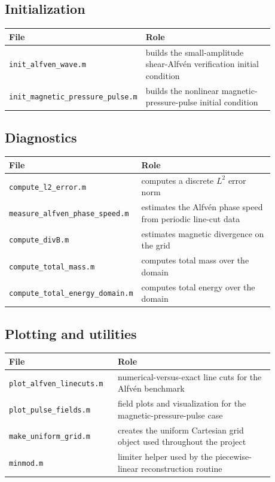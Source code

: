 \documentclass[11pt]{article}
\begin{document}
\subsection{Initialization}
\begin{center}
\begin{tabular}{p{0.33\linewidth} p{0.55\linewidth}}
\toprule
\textbf{File} & \textbf{Role} \\
\midrule
\texttt{init\_alfven\_wave.m} & builds the small-amplitude shear-Alfv\'en verification initial condition \\
\texttt{init\_magnetic\_pressure\_pulse.m} & builds the nonlinear magnetic-pressure-pulse initial condition \\
\bottomrule
\end{tabular}
\end{center}

\subsection{Diagnostics}
\begin{center}
\begin{tabular}{p{0.33\linewidth} p{0.55\linewidth}}
\toprule
\textbf{File} & \textbf{Role} \\
\midrule
\texttt{compute\_l2\_error.m} & computes a discrete $L^2$ error norm \\
\texttt{measure\_alfven\_phase\_speed.m} & estimates the Alfv\'en phase speed from periodic line-cut data \\
\texttt{compute\_divB.m} & estimates magnetic divergence on the grid \\
\texttt{compute\_total\_mass.m} & computes total mass over the domain \\
\texttt{compute\_total\_energy\_domain.m} & computes total energy over the domain \\
\bottomrule
\end{tabular}
\end{center}

\subsection{Plotting and utilities}
\begin{center}
\begin{tabular}{p{0.33\linewidth} p{0.55\linewidth}}
\toprule
\textbf{File} & \textbf{Role} \\
\midrule
\texttt{plot\_alfven\_linecuts.m} & numerical-versus-exact line cuts for the Alfv\'en benchmark \\
\texttt{plot\_pulse\_fields.m} & field plots and visualization for the magnetic-pressure-pulse case \\
\texttt{make\_uniform\_grid.m} & creates the uniform Cartesian grid object used throughout the project \\
\texttt{minmod.m} & limiter helper used by the piecewise-linear reconstruction routine \\
\bottomrule
\end{tabular}
\end{center}
\end{document}
